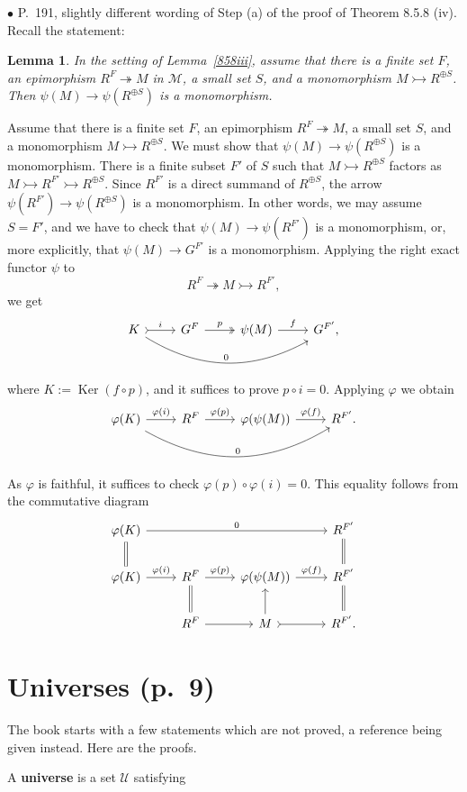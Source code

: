 \documentclass[12pt]{article}
\newtheorem{lem}[thm]{Lemma}
\theoremstyle{remark}%
\newcommand{\bu}{\bullet}
\newcommand{\n}{\noindent}
\newcommand{\M}{\mathcal M}
\newcommand{\epi}{\twoheadrightarrow}
\newcommand{\m}{\rightarrowtail}
\newcommand{\p}{\varphi}
\newcommand{\pf}{\n{\em Proof. }}
\DeclareMathOperator{\Ker}{Ker}
\begin{document}
\n$\bu$ P.~191, slightly different wording of Step (a) of the proof of Theorem 8.5.8 (iv). Recall the statement: 
%
\begin{lem}
%
In the setting of Lemma~\ref{858iii}, assume that there is a finite set $F$, an epimorphism $R^F\epi M$ in $\M$, a small set $S$, and a monomorphism $M\m R^{\oplus S}$. Then $\psi(M)\to\psi(R^{\oplus S})$ is a monomorphism. 
%
\end{lem}
%
\pf Assume that there is a finite set $F$, an epimorphism $R^F\epi M$, a small set $S$, and a monomorphism $M\m R^{\oplus S}$. We must show that $\psi(M)\to\psi(R^{\oplus S})$ is a monomorphism. There is a finite subset $F'$ of $S$ such that $M\m R^{\oplus S}$ factors as $M\m R^{F'}\m R^{\oplus S}$. Since $R^{F'}$ is a direct summand of $R^{\oplus S}$, the arrow $\psi(R^{F'})\to\psi(R^{\oplus S})$ is a monomorphism. In other words, we may assume $S=F'$, and we have to check that $\psi(M)\to\psi(R^{F'})$ is a monomorphism, or, more explicitly, that $\psi(M)\to G^{F'}$ is a monomorphism. Applying the right exact functor $\psi$ to 
$$
R^F\epi M\m R^{F'},
$$
we get 
$$
\begin{tikzcd}
K\ar[tail]{r}{i}\ar[bend right]{rrr}{0}&G^F\ar[two heads]{r}{p}&\psi(M)\ar{r}{f}&G^{F'},
\end{tikzcd}
$$
where $K:=\Ker(f\circ p)$, and it suffices to prove $p\circ i=0$. Applying $\p$ we obtain
$$
\begin{tikzcd}
\p(K)\ar{r}{\p(i)}\ar[bend right]{rrr}{0}&R^F\ar{r}{\p(p)}&\p(\psi(M))\ar{r}{\p(f)}&R^{F'}.
\end{tikzcd}
$$
As $\p$ is faithful, it suffices to check $\p(p)\circ\p(i)=0$. This equality follows from the commutative diagram
$$
\begin{tikzcd}
\p(K)\ar[equal]{d}\ar{rrr}{0}&&&R^{F'}\ar[equal]{d}\\
\p(K)\ar{r}{\p(i)}&R^F\ar[equal]{d}\ar{r}{\p(p)}&\p(\psi(M))\ar{r}{\p(f)}&R^{F'}\ar[equal]{d}\\
&R^F\ar{r}&M\ar[tail]{r}\ar{u}&R^{F'}.
\end{tikzcd}
$$ 

%
\section{Universes (p.~9)}%
%
The book starts with a few statements which are not proved, a reference being given instead. Here are the proofs.

A \textbf{universe} is a set $\mathcal U$ satisfying 
\end{document}
